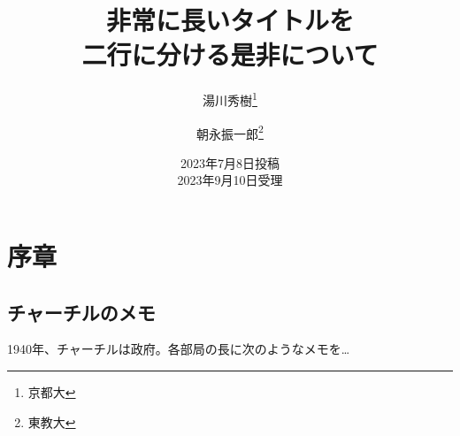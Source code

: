 \documentclass{jlreq}
\begin{document}
\title{非常に長いタイトルを \\ 二行に分ける是非について}
\author{湯川秀樹\thanks{京都大} \and 朝永振一郎\thanks{東教大}}
\date{2023年7月8日投稿 \\ 2023年9月10日受理}
\maketitle

\section{序章}
\subsection{チャーチルのメモ}
 1940年、チャーチルは政府。各部局の長に次のようなメモを…
\end{document}
